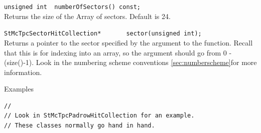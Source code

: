 \begin{Entry}
    \verb+unsigned int  numberOfSectors() const;+\\
    Returns the size of the Array of sectors.  Default is 24.

    \verb+StMcTpcSectorHitCollection*       sector(unsigned int);+\\
    Returns a pointer to the sector specified by the argument to the
    function.  Recall that this is for indexing into an array, so the
    argument should go from 0 - (size()-1).  Look in the
    numbering scheme conventions \ref{sec:numberscheme}for more information.

\item[Examples]
{\footnotesize
\begin{verbatim}
//
// Look in StMcTpcPadrowHitCollection for an example.
// These classes normally go hand in hand.
\end{verbatim}
}%
\end{Entry}

\clearpage
%
%
